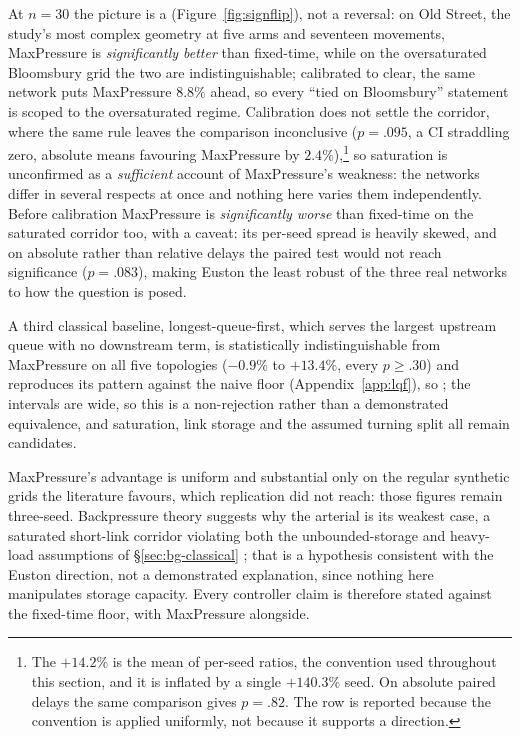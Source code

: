 At $n{=}30$ the picture is a 
(Figure~\ref{fig:signflip}), not a reversal: on Old Street, the study's most complex geometry at five arms
and seventeen movements, MaxPressure is \emph{significantly better} than
fixed-time, while on the oversaturated Bloomsbury grid the two are
indistinguishable; calibrated to clear, the same network puts MaxPressure
$8.8\%$ ahead, so every ``tied on Bloomsbury'' statement is scoped to the
oversaturated regime. Calibration does not settle the corridor, where the
same rule leaves the comparison inconclusive ($p{=}.095$, a CI straddling
zero, absolute means favouring MaxPressure by $2.4\%$),\footnote{The
$+14.2\%$ is the mean of per-seed ratios, the convention used throughout
this section, and it is inflated by a single $+140.3\%$ seed. On absolute
paired delays the same comparison gives $p{=}.82$. The row is reported
because the convention is applied uniformly, not because it supports a
direction.} so saturation is unconfirmed as a \emph{sufficient} account of
MaxPressure's weakness: the networks differ in several respects at once and
nothing here varies them independently. Before calibration MaxPressure is
\emph{significantly worse} than fixed-time on the saturated corridor too,
with a caveat: its per-seed spread is heavily skewed, and on absolute
rather than relative delays the paired test would not reach significance
($p{=}.083$), making Euston the least robust of the three real networks to
how the question is posed.

A third classical baseline, longest-queue-first, which serves the largest
upstream queue with no downstream term, is statistically indistinguishable
from MaxPressure on all five topologies ($-0.9\%$ to $+13.4\%$, every
$p\ge.30$) and reproduces its pattern against the naive floor
(Appendix~\ref{app:lqf}), so ; the intervals are wide, so this is a non-rejection rather than
a demonstrated equivalence, and saturation, link storage and the assumed
turning split all remain candidates.



MaxPressure's advantage is uniform and substantial only on the regular
synthetic grids the literature favours, which replication did not reach:
those figures remain three-seed. Backpressure theory suggests why the
arterial is its weakest case, a saturated short-link corridor violating
both the unbounded-storage and heavy-load assumptions of
\S\ref{sec:bg-classical} \cite{gregoire2014backpressure,gregoire2014routing};
that is a hypothesis consistent with the Euston direction, not a
demonstrated explanation, since nothing here manipulates storage capacity.
Every controller claim is therefore stated against the fixed-time floor,
with MaxPressure alongside.
